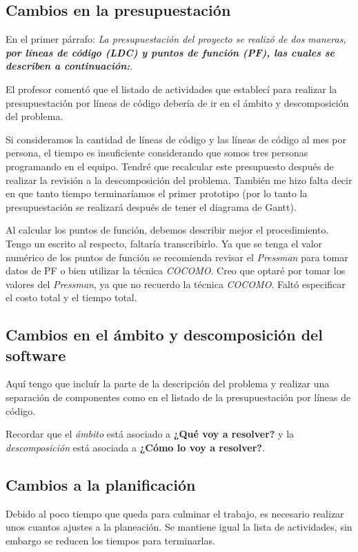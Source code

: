\documentclass[letterpaper]{article}
\begin{document}
\subsection{Cambios en la presupuestación}
En el primer párrafo: \emph{La presupuestación del proyecto se realizó de dos maneras, \textbf{por líneas de código (LDC) y puntos de función (PF), las cuales se describen a continuación:}}.

El profesor comentó que el listado de actividades que establecí para realizar la presupuestación por líneas de código debería de ir en el ámbito y descomposición del problema.

Si consideramos la cantidad de líneas de código y las líneas de código al mes por persona, el tiempo es insuficiente considerando que somos tres personas programando en el equipo. Tendré que recalcular este presupuesto después de realizar la revisión a la descomposición del problema. También me hizo falta decir en que tanto tiempo terminaríamos el primer prototipo (por lo tanto la presupuestación se realizará después de tener el diagrama de Gantt).

Al calcular los puntos de función, debemos describir mejor el procedimiento. Tengo un escrito al respecto, faltaría transcribirlo. Ya que se tenga el valor numérico de los puntos de función se recomienda revisar el \emph{Pressman} para tomar datos de PF o bien utilizar la técnica \emph{COCOMO}. Creo que optaré por tomar los valores del \emph{Pressman}, ya que no recuerdo la técnica \emph{COCOMO}. Faltó especificar el costo total y el tiempo total.

\subsection{Cambios en el ámbito y descomposición del software}
Aquí tengo que incluír la parte de la descripción del problema y realizar una separación de componentes como en el listado de la presupuestación por líneas de código.

Recordar que el \emph{ámbito} está asociado a \textbf{¿Qué voy a resolver?} y la \emph{descomposición} está asociada a \textbf{¿Cómo lo voy a resolver?}.

\subsection{Cambios a la planificación}
Debido al poco tiempo que queda para culminar el trabajo, es necesario realizar unos cuantos ajustes a la planeación. Se mantiene igual la lista de actividades, sin embargo se reducen los tiempos para terminarlas.
\end{document}
